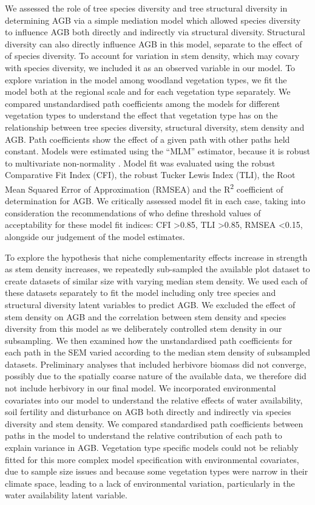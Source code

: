 \documentclass[11pt,a4paper]{article}
\begin{document}
We assessed the role of tree species diversity and tree structural diversity in determining AGB via a simple mediation model which allowed species diversity to influence AGB both directly and indirectly via structural diversity. Structural diversity can also directly influence AGB in this model, separate to the effect of of species diversity. To account for variation in stem density, which may covary with species diversity, we included it as an observed variable in our model. To explore variation in the model among woodland vegetation types, we fit the model both at the regional scale and for each vegetation type separately. We compared unstandardised path coefficients among the models for different vegetation types to understand the effect that vegetation type has on the relationship between tree species diversity, structural diversity, stem density and AGB. Path coefficients show the effect of a given path with other paths held constant. Models were estimated using the ``MLM'' estimator, because it is robust to multivariate non-normality \citep{Shapiro1983}. Model fit was evaluated using the robust Comparative Fit Index (CFI), the robust Tucker Lewis Index (TLI), the Root Mean Squared Error of Approximation (RMSEA) and the R\textsuperscript{2} coefficient of determination for AGB. We critically assessed model fit in each case, taking into consideration the recommendations of \citet{Hu1999} who define threshold values of acceptability for these model fit indices: CFI >0.85, TLI >0.85, RMSEA <0.15, alongside our judgement of the model estimates.

To explore the hypothesis that niche complementarity effects increase in strength as stem density increases, we repeatedly sub-sampled the available plot dataset to create \subn{} datasets of similar size with varying median stem density. We used each of these datasets separately to fit the model including only tree species and structural diversity latent variables to predict AGB. We excluded the effect of stem density on AGB and the correlation between stem density and species diversity from this model as we deliberately controlled stem density in our subsampling. We then examined how the unstandardised path coefficients for each path in the SEM varied according to the median stem density of subsampled datasets. Preliminary analyses that included herbivore biomass \citep{Hempson2017} did not converge, possibly due to the spatially coarse nature of the available data, we therefore did not include herbivory in our final model. We incorporated environmental covariates into our model to understand the relative effects of water availability, soil fertility and disturbance on AGB both directly and indirectly via species diversity and stem density. We compared standardised path coefficients between paths in the model to understand the relative contribution of each path to explain variance in AGB. Vegetation type specific models could not be reliably fitted for this more complex model specification with environmental covariates, due to sample size issues and because some vegetation types were narrow in their climate space, leading to a lack of environmental variation, particularly in the water availability latent variable.
\end{document}
